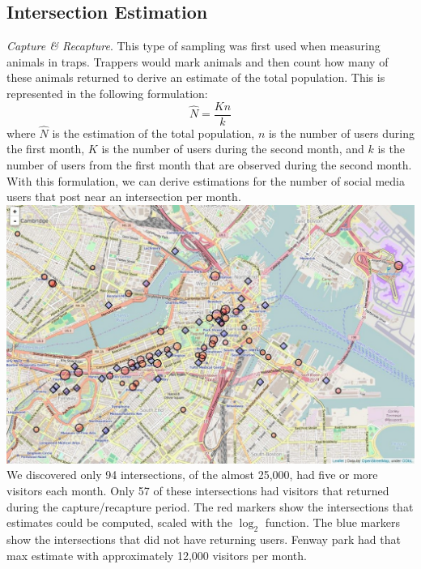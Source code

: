 \documentclass{lposter}
\theoremstyle{plain}
\theoremstyle{definition}
\newcommand{\red}[1]{{\color{red}#1}}
\newcommand{\blue}[1]{{\color{blue}#1}}
\begin{document}
\begin{poster}
\section{Intersection Estimation}
\textit{Capture \& Recapture}. This type of sampling was first used when measuring animals in traps. Trappers would mark animals and then count how many of these animals returned to derive an estimate of the total population. This is represented in the following formulation: $$\hat{N} = \frac{Kn}{k}$$ where $\hat{N}$ is the estimation of the total population, $n$ is the number of users during the first month, $K$ is the number of users during the second month, and $k$ is the number of users from the first month that are observed during the second month. With this formulation, we can derive estimations for the number of social media users that post near an intersection per month. 
\includegraphics[scale=0.55]{estimate.jpg}
We discovered only 94 intersections, of the almost 25,000, had five or more visitors each month. Only 57 of these intersections had visitors that returned during the capture/recapture period. The \red{red markers} show the intersections that estimates could be computed, scaled with the $\log_2$ function. The \blue{blue markers} show the intersections that did not have returning users. Fenway park had that max estimate with approximately 12,000 visitors per month. 

\end{poster}
\end{document}
